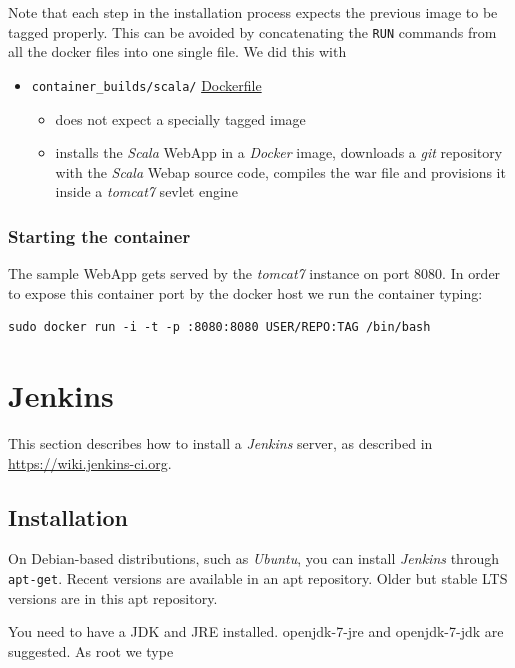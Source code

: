 \documentclass[captions=tableheading]{article}
\begin{document}
Note that each step in the installation process expects the previous image to be tagged properly. This can be avoided by concatenating the \texttt{RUN} commands from all the docker files into one single file. We did this with
\begin{itemize}
\item \texttt{container\_builds/scala/} \href{file:///debiandata/michael/elemica/docker/poc-docker-jenkins/container_builds/scala/Dockerfile}{Dockerfile}
\begin{itemize}
\item does not expect a specially tagged image
\item installs the  \emph{Scala} WebApp in a \emph{Docker} image, downloads a \emph{git} repository with the \emph{Scala} Webap source code, compiles the war file and provisions it inside a \emph{tomcat7} sevlet engine
\end{itemize}
\end{itemize}
\subsubsection{Starting the container}
\label{sec-4-5-3}

The sample WebApp gets served by the \emph{tomcat7} instance on port 8080. In order to expose this container port by the docker host we run the container  typing:

\begin{verbatim}
sudo docker run -i -t -p :8080:8080 USER/REPO:TAG /bin/bash
\end{verbatim}
\section{Jenkins}
\label{sec-5}

This section describes how to install a \emph{Jenkins} server, as described in \href{https://wiki.jenkins-ci.org/display/JENKINS/Installing%2BJenkins%2Bon%2BUbuntu}{https://wiki.jenkins-ci.org}. 
\subsection{Installation}
\label{sec-5-1}

On Debian-based distributions, such as \emph{Ubuntu}, you can install \emph{Jenkins} through \texttt{apt-get}. Recent versions are available in an apt repository. Older but stable LTS versions are in this apt repository.

You need to have a JDK and JRE installed. openjdk-7-jre and openjdk-7-jdk are suggested. As root we type
\end{document}
